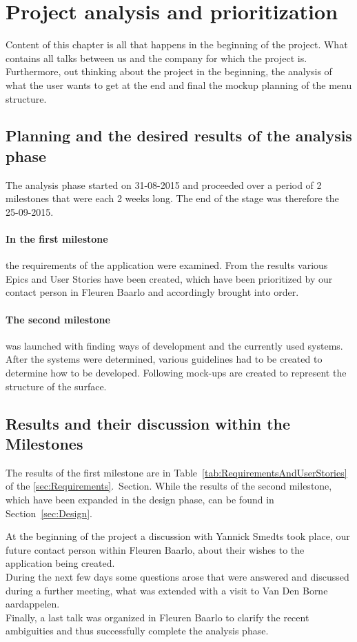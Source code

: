 \section{Project analysis and prioritization}
\label{analysis}
Content of this chapter is all that happens in the beginning of the project. What contains all talks between us and the company for which the project is. Furthermore, out thinking about the project in the beginning, the analysis of what the user wants to get at the end and final the mockup planning of the menu structure.

\subsection{Planning and the desired results of the analysis phase}
The analysis phase started on 31-08-2015 and proceeded over a period of 2 milestones that were each 2 weeks long. The end of the stage was therefore the 25-09-2015.

\paragraph{In the first milestone} the requirements of the application were examined. From the results various Epics and User Stories have been created, which have been prioritized by our contact person in Fleuren Baarlo and accordingly brought into order.

\paragraph{The second milestone} was launched with finding ways of development and the currently used systems. After the systems were determined, various guidelines had to be created to determine how to be developed.
Following mock-ups are created to represent the structure of the surface.

\subsection{Results and their discussion within the Milestones}
The results of the first milestone are in Table~\ref{tab:RequirementsAndUserStories} of the \ref{sec:Requirements}.~Section. While the results of the second milestone, which have been expanded in the design phase, can be found in Section~\ref{sec:Design}.

At the beginning of the project a discussion with Yannick Smedts took place, our future contact person within Fleuren Baarlo, about their wishes to the application being created.\\
During the next few days some questions arose that were answered and discussed during a further meeting, what was extended with a visit to Van Den Borne aardappelen.\\
Finally, a last talk was organized in Fleuren Baarlo to clarify the recent ambiguities and thus successfully complete the analysis phase.


